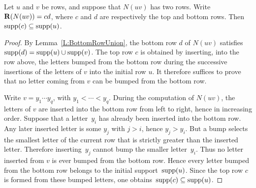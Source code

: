 \documentclass[a4paper, twoside, 11pt, english]{article}
\begin{document}
\begin{lemma}
\label{L:TopRowInclusion}
Let $u$ and $v$ be rows, and suppose that $N(uv)$ has two rows. Write
$\mathbf{R}(N(uv))=cd$, where $c$ and $d$ are respectively the top and bottom rows.
Then $\operatorname{supp}(c)\subseteq\operatorname{supp}(u)$.
\end{lemma}


\begin{proof}
By Lemma~\ref{L:BottomRowUnion}, the bottom row $d$ of $N(uv)$ satisfies~$\operatorname{supp}(d)=\operatorname{supp}(u)\cup\operatorname{supp}(v)$.
The top row $c$ is obtained by inserting, into the row above, the letters bumped
from the bottom row during the successive insertions of the letters of $v$ into
the initial row $u$. It therefore suffices  to prove that no letter coming from
$v$ can be bumped from the bottom row.

Write $v=y_1\cdots y_q$, with $y_1<\cdots<y_q$. During the computation of
$N(uv)$, the letters of $v$ are inserted into the bottom row from left to right,
hence in increasing order.
Suppose that a letter~$y_i$ has already been inserted into the bottom row. Any
later inserted letter is some $y_j$ with $j>i$, hence $y_j>y_i$. But a bump
selects the smallest letter of the current row that is strictly greater than the
inserted letter. Therefore inserting~$y_j$ cannot bump the smaller letter~$y_i$.
Thus no letter inserted from $v$ is ever bumped from the bottom row. Hence every
letter bumped from the bottom row belongs to the initial support~$\operatorname{supp}(u)$.
Since the top row $c$ is formed from these bumped letters, one obtains~$\operatorname{supp}(c)\subseteq\operatorname{supp}(u)$.
\end{proof}
\end{document}
